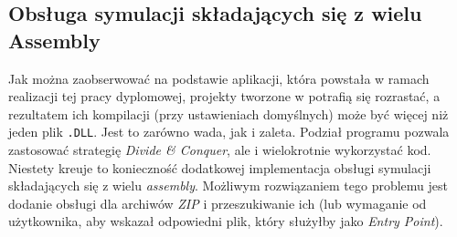 \subsection{Obsługa symulacji składających się z wielu Assembly}

\par Jak można zaobserwować na podstawie aplikacji, która powstała w ramach realizacji tej pracy dyplomowej, projekty tworzone w \emph{\dotnet{}} potrafią się rozrastać, a rezultatem ich kompilacji (przy ustawieniach domyślnych) może być więcej niż jeden plik \texttt{.DLL}. Jest to zarówno wada, jak i zaleta. Podział programu pozwala zastosować strategię \emph{Divide \& Conquer}, ale i wielokrotnie wykorzystać kod. Niestety kreuje to konieczność dodatkowej implementacja obsługi symulacji składających się z wielu \emph{assembly}. Możliwym rozwiązaniem tego problemu jest dodanie obsługi dla archiwów \emph{ZIP} i przeszukiwanie ich (lub wymaganie od użytkownika, aby wskazał odpowiedni plik, który służyłby jako \emph{Entry Point}).